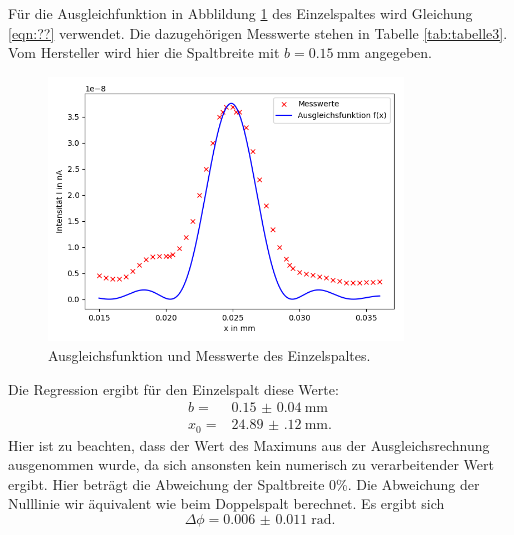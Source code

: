 Für die Ausgleichfunktion in Abblildung \ref{fig:plot3} des Einzelspaltes
wird Gleichung \ref{eqn:??} verwendet.
Die dazugehörigen Messwerte stehen in Tabelle \ref{tab:tabelle3}.
Vom Hersteller wird hier die Spaltbreite mit $b=\SI{0,15}{\mm}$ angegeben.


\begin{figure}
  \centering
  \includegraphics[height=7cm]{Figure_4.png}
  \caption{Ausgleichsfunktion und Messwerte des Einzelspaltes.}
  \label{fig:plot3}
\end{figure}

Die Regression ergibt für den Einzelspalt diese Werte:
\begin{align*}
  b =&\SI{0.15(4)}{\mm}\\
  x_{0} =&\SI{24.89(12)}{\mm}.
\end{align*}
Hier ist zu beachten, dass der Wert des Maximuns aus der Ausgleichsrechnung ausgenommen
wurde, da sich ansonsten kein numerisch zu verarbeitender Wert ergibt.
Hier beträgt die Abweichung der Spaltbreite 0\%.
Die Abweichung der Nulllinie wir äquivalent wie beim Doppelspalt berechnet.
Es ergibt sich
\begin{equation*}
  \Delta \phi= \SI{0.006(11)}\; \text{rad}.
\end{equation*}
